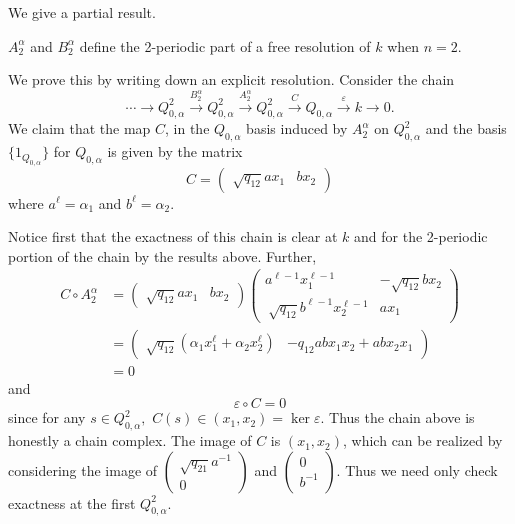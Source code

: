 \documentclass [11pt, proquest] {uwthesis}[2020/02/24]
\begin{document}
    We give a partial result.
    \begin{lem}\label{lem:2-dim-k-factorization}
        $A_2^\alpha$ and $B_2^\alpha$ define the 2-periodic part of a free resolution of $k$ when $n=2.$
    \end{lem}
    \begin{prf}
        We prove this by writing down an explicit resolution. Consider the chain
        \[\cdots\to Q_{0,\alpha}^2\xrightarrow{B_2^\alpha} Q_{0,\alpha}^2\xrightarrow{A_2^\alpha} Q_{0,\alpha}^2\xrightarrow{C} Q_{0,\alpha} \xrightarrow{\varepsilon}k\to 0.\]
        We claim that the map $C$, in the $Q_{0,\alpha}$ basis induced by $A_2^\alpha$ on $Q_{0,\alpha}^2$ and the basis $\{1_{Q_{0,\alpha}}\}$ for $Q_{0,\alpha}$ is given by the matrix
        \[C=\begin{pmatrix}
            \sqrt{q_{12}}a x_1 & bx_2
        \end{pmatrix}\]
        where $a^\ell=\alpha_1$ and $b^\ell=\alpha_2$.
        
        Notice first that the exactness of this chain is clear at $k$ and for the 2-periodic portion of the chain by the results above. Further, 
        \begin{align*}
            C\circ A_2^\alpha &= \begin{pmatrix}
            \sqrt{q_{12}}a x_1 & bx_2
        \end{pmatrix}\begin{pmatrix}
            a^{\ell-1}x_1^{\ell -1} & -\sqrt{q_{12}}bx_2\\ \
            \sqrt{q_{12}}b^{\ell-1}x_2^{\ell -1} & ax_1
        \end{pmatrix}\\
        &=\begin{pmatrix}
            \sqrt{q_{12}}(\alpha_1x_1^\ell + \alpha_2x_2^\ell) & -q_{12}abx_1x_2+abx_2x_1
        \end{pmatrix}\\
        &=0
        \end{align*}
        and
        \[\varepsilon\circ C = 0\]
        since for any $s\in Q_{0,\alpha}^2,$ $C(s)\in(x_1,x_2)=\ker\varepsilon $. Thus the chain above is honestly a chain complex. The image of $C$ is $(x_1,x_2)$, which can be realized by considering the image of $(\begin{smallmatrix}
            \sqrt{q_{21}}a^{-1}\\ 0
        \end{smallmatrix})$ and $(\begin{smallmatrix}
            0\\ b^{-1}
        \end{smallmatrix}).$ Thus we need only check exactness at the first $Q_{0,\alpha}^2.$
        

\end{prf}
\end{document}
